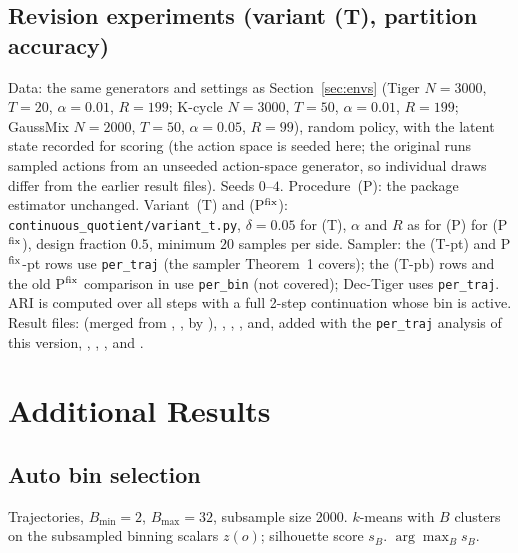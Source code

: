 \documentclass[10pt]{article}
\begin{document}
\subsection{Revision experiments (variant (T), partition accuracy)}
Data: the same generators and settings as Section~\ref{sec:envs} (Tiger
$N{=}3000$, $T{=}20$, $\alpha{=}0.01$, $R{=}199$; K-cycle $N{=}3000$, $T{=}50$,
$\alpha{=}0.01$, $R{=}199$; GaussMix $N{=}2000$, $T{=}50$, $\alpha{=}0.05$,
$R{=}99$), random policy, with the latent state recorded for scoring (the
action space is seeded here; the original runs sampled actions from an unseeded
action-space generator, so individual draws differ from the earlier result
files).  Seeds $0$--$4$.  Procedure~(P): the package estimator unchanged.
Variant~(T) and (P$^{\rm fix}$): \texttt{continuous\_quotient/variant\_t.py},
$\delta=0.05$ for (T), $\alpha$ and $R$ as for (P) for (P$^{\rm fix}$), design
fraction $0.5$, minimum $20$ samples per side.  Sampler: the (T-pt) and P$^{\rm fix}$-pt rows
use \texttt{per\_traj} (the sampler Theorem~1 covers); the (T-pb) rows and the
old P$^{\rm fix}$ comparison in  use
\texttt{per\_bin} (not covered); Dec-Tiger uses \texttt{per\_traj}.  ARI is computed over all steps with a
full 2-step continuation whose bin is active.  Result files:
 (merged from ,
,  by ),
, ,
, and, added with the \texttt{per\_traj} analysis
of this version, ,
, ,
 and .

\section{Additional Results}
\label{sec:ablations}

\subsection{Auto bin selection}

\begin{algorithm}[h]
\caption{\textsc{AutoBinSelection} (Algorithm~2)}
\label{alg:autobin}
\begin{algorithmic}[1]
\Require Trajectories, $B_{\min}=2$, $B_{\max}=32$, subsample size 2000.
  \State $k$-means with $B$ clusters on the subsampled binning scalars $z(o)$; silhouette score $s_B$.
\EndFor
\State \Return $\arg\max_Bs_B$.
\end{algorithmic}
\end{algorithm}
\end{document}
